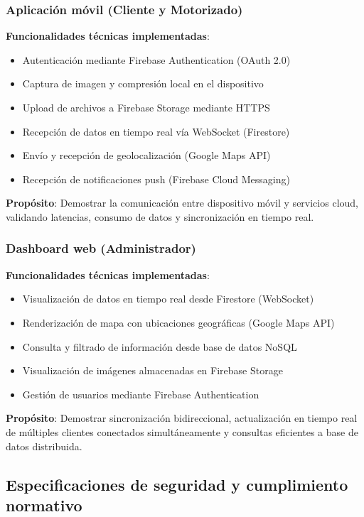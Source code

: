 \subsubsection{Aplicación móvil (Cliente y Motorizado)}

\textbf{Funcionalidades técnicas implementadas}:
\begin{itemize}
    \item Autenticación mediante Firebase Authentication (OAuth 2.0)
    \item Captura de imagen y compresión local en el dispositivo
    \item Upload de archivos a Firebase Storage mediante HTTPS
    \item Recepción de datos en tiempo real vía WebSocket (Firestore)
    \item Envío y recepción de geolocalización (Google Maps API)
    \item Recepción de notificaciones push (Firebase Cloud Messaging)
\end{itemize}

\textbf{Propósito}: Demostrar la comunicación entre dispositivo móvil y servicios cloud, validando latencias, consumo de datos y sincronización en tiempo real.

\subsubsection{Dashboard web (Administrador)}

\textbf{Funcionalidades técnicas implementadas}:
\begin{itemize}
    \item Visualización de datos en tiempo real desde Firestore (WebSocket)
    \item Renderización de mapa con ubicaciones geográficas (Google Maps API)
    \item Consulta y filtrado de información desde base de datos NoSQL
    \item Visualización de imágenes almacenadas en Firebase Storage
    \item Gestión de usuarios mediante Firebase Authentication
\end{itemize}

\textbf{Propósito}: Demostrar sincronización bidireccional, actualización en tiempo real de múltiples clientes conectados simultáneamente y consultas eficientes a base de datos distribuida.

\subsection{Especificaciones de seguridad y cumplimiento normativo}

